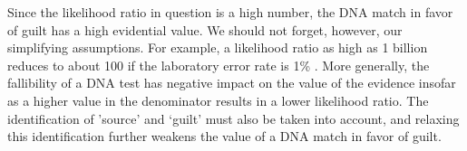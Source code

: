 \documentclass[10pt]{article}
\begin{document}

Since the likelihood ratio in question is a high number, the DNA match in favor of guilt 
has a high evidential value. We should not forget, however, 
our simplifying assumptions. For example, a likelihood ratio as high as 
1 billion reduces to about 100 if the laboratory error rate is 1\% \citep{Thomason2003How-the-Probabi}.
More generally, the fallibility of a DNA test has negative impact on the value of the evidence insofar as a higher 
value in the denominator results in a lower likelihood ratio. The identification of 'source' and 
`guilt' must also be taken into account, and relaxing this identification 
further weakens the value of a DNA match in favor of guilt.
\end{document}
